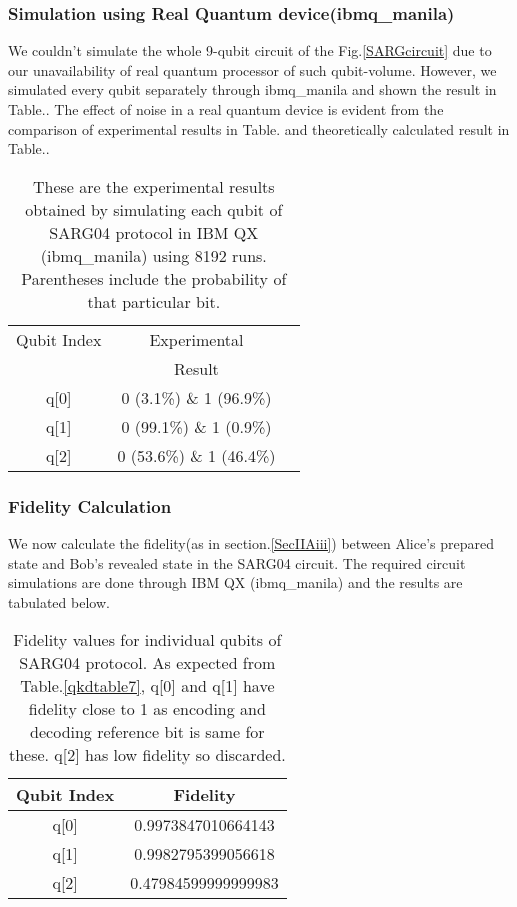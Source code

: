 \documentclass[superscriptaddress,twocolumn,showpacs,prb,floatfix]{revtex4}
\begin{document}
\subsubsection{Simulation using Real Quantum device(ibmq\_manila)}
\label{SecIIIAii}
We couldn't simulate the whole 9-qubit circuit of the Fig.\ref{SARGcircuit} due to our unavailability of real quantum processor of such qubit-volume. However, we simulated every qubit separately through ibmq\_manila and shown the result in Table.\label{qkdtable10}. The effect of noise in a real quantum device is evident from the comparison of experimental results in Table.\label{qkdtable10} and theoretically calculated result in Table.\label{qkdtable9}.
\begin{table}[ht]
    \centering
    \begin{tabular}{|c|c|c|}
    \hline\hline
    Qubit Index & Experimental\\ & Result  \\ [0.5ex]
    \hline
    q[0] & 0 (3.1\%) \& 1 (96.9\%)\\[0.5ex]
    \hline
    q[1] & 0 (99.1\%) \& 1 (0.9\%)\\[0.5ex]
    \hline
    q[2] & 0 (53.6\%) \& 1 (46.4\%) \\[0.5ex]
    \hline
    \end{tabular}
    \caption{These are the experimental results obtained by simulating each qubit of SARG04 protocol in IBM QX (ibmq\_manila) using 8192 runs. Parentheses include the probability of that particular bit.}
    \label{qkdtable10}
\end{table}
\subsubsection{Fidelity Calculation}
\label{SecIIIAiii}

We now calculate the fidelity(as in section.\ref{SecIIAiii}) between Alice's prepared state and Bob's revealed state in the SARG04 circuit. The required circuit simulations are done through IBM QX (ibmq\_manila) and the results are tabulated below.

\begin{table}[ht]
    \centering
    \begin{tabular}{|c|c|}
    \hline
    \hline
    Qubit Index & Fidelity \\[0.5ex]
    \hline
    q[0] & 0.9973847010664143  \\[0.5ex]
    \hline
    q[1] & 0.9982795399056618 \\[0.5ex]
    \hline
    q[2] & 0.47984599999999983 \\[0.5ex]
    \hline
    \end{tabular}
    \caption{Fidelity values for individual qubits of SARG04 protocol. As expected from Table.\ref{qkdtable7}, q[0] and q[1] have fidelity close to 1 as encoding and decoding reference bit is same for these. q[2] has low fidelity so discarded.}
    \label{fid_table_SARG}
\end{table}
\end{document}
